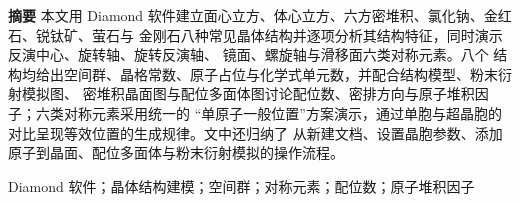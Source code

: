 {\bfseries 摘要}\quad
本文用 Diamond 软件建立面心立方、体心立方、六方密堆积、氯化钠、金红石、锐钛矿、萤石与
金刚石八种常见晶体结构并逐项分析其结构特征，同时演示反演中心、旋转轴、旋转反演轴、
镜面、螺旋轴与滑移面六类对称元素。八个
结构均给出空间群、晶格常数、原子占位与化学式单元数，并配合结构模型、粉末衍射模拟图、
密堆积晶面图与配位多面体图讨论配位数、密排方向与原子堆积因子；六类对称元素采用统一的
``单原子一般位置''方案演示，通过单胞与超晶胞的对比呈现等效位置的生成规律。文中还归纳了
从新建文档、设置晶胞参数、添加原子到晶面、配位多面体与粉末衍射模拟的操作流程。

\vspace{4pt}

\par{}Diamond 软件；晶体结构建模；空间群；对称元素；配位数；原子堆积因子
